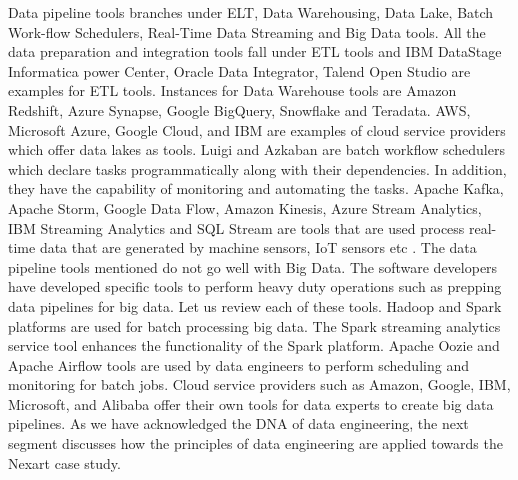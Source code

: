 \documentclass[a4Paper,12pt]{report}
\begin{document}
Data pipeline tools branches under ELT, Data Warehousing, Data Lake, Batch Work-flow Schedulers, Real-Time Data Streaming and Big Data tools. All the data preparation and integration tools fall under ETL tools and IBM DataStage Informatica power Center, Oracle Data Integrator, Talend Open Studio are examples for ETL tools. Instances for Data Warehouse tools are Amazon Redshift, Azure Synapse, Google BigQuery, Snowflake and Teradata. AWS, Microsoft Azure, Google Cloud, and IBM are examples of cloud service providers which offer data lakes as tools. Luigi and Azkaban are batch workflow schedulers which declare tasks programmatically along with their dependencies. In addition, they have the capability of monitoring and automating the tasks. Apache Kafka, Apache Storm, Google Data Flow, Amazon Kinesis, Azure Stream Analytics, IBM Streaming Analytics and SQL Stream are tools that are used process real-time data that are generated by machine sensors, IoT sensors etc \cite{alexsoft}. The data pipeline tools mentioned do not go well with Big Data. The software developers have developed specific tools to perform heavy duty operations such as prepping data pipelines for big data. Let us review each of these tools. Hadoop and Spark platforms are used for batch processing big data. The Spark streaming analytics service tool enhances the functionality of the Spark platform. Apache Oozie and Apache Airflow tools are used by data engineers to perform scheduling and monitoring for batch jobs. Cloud service providers such as Amazon, Google, IBM, Microsoft, and Alibaba offer their own tools for data experts to create big data pipelines. As we have acknowledged the DNA of data engineering, the next segment discusses how the principles of data engineering are applied towards the Nexart case study. 
\end{document}
